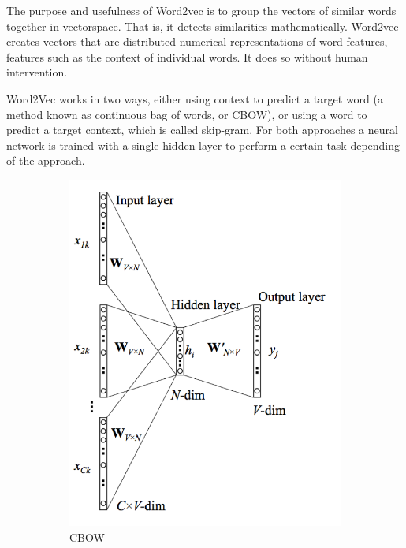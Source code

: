 \documentclass[]{article}
\begin{document}
	The purpose and usefulness of Word2vec is to group the vectors of similar words together in vectorspace. That is, it detects similarities mathematically. Word2vec creates vectors that are distributed numerical representations of word features, features such as the context of individual words. It does so without human intervention. 
	
	Word2Vec works in two ways, either using context to predict a target word (a method known as continuous bag of words, or CBOW), or using a word to predict a target context, which is called skip-gram. For both approaches a neural network is trained with a single hidden layer to perform a certain task depending of the approach. 
	
	\begin{figure}
		\begin{subfigure}{.5\textwidth}
			\centering
			\includegraphics[width=.8\linewidth]{Figures/CBOW}
			\caption{CBOW}
			\label{fig:sfig1}
		\end{subfigure}%
		\begin{subfigure}{.5\textwidth}
			\centering

\end{subfigure}
\end{figure}
\end{document}
